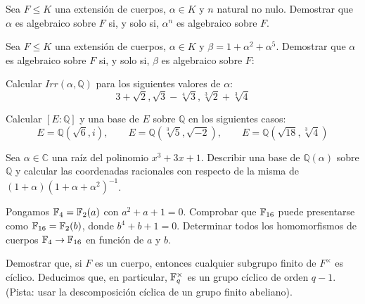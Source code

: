\begin{ejercicio}
    Sea $F\leq K$ una extensión de cuerpos, $\alpha\in K$ y $n$ natural no nulo. Demostrar que $\alpha$ es algebraico sobre $F$ si, y solo si, $\alpha^n$ es algebraico sobre $F$.
\end{ejercicio}

\begin{ejercicio}
    Sea $F\leq K$ una extensión de cuerpos, $\alpha\in K$ y $\beta = 1+\alpha^2 + \alpha^5$. Demostrar que $\alpha$ es algebraico sobre $F$ si, y solo si, $\beta$ es algebraico sobre $F$:
\end{ejercicio}

\begin{ejercicio}
    Calcular $Irr(\alpha,\mathbb{Q})$ para los siguientes valores de $\alpha$:
    \begin{equation*}
        3+\sqrt{2}, \sqrt{3}-\sqrt[4]{3}, \sqrt[3]{2}+\sqrt[3]{4}
    \end{equation*}
\end{ejercicio}

\begin{ejercicio}
    Calcular $[E:\mathbb{Q}]$ y una base de $E$ sobre $\mathbb{Q}$ en los siguientes casos:
    \begin{equation*}
        E = \mathbb{Q}\left(\sqrt{6},i\right), \qquad E= \mathbb{Q}\left(\sqrt[3]{5},\sqrt{-2}\right), \qquad E = \mathbb{Q}\left(\sqrt{18},\sqrt[3]{4}\right)
    \end{equation*}
\end{ejercicio}

\begin{ejercicio}
    Sea $\alpha\in \mathbb{C}$ una raíz del polinomio $x^3+3x+1$. Describir una base de $\mathbb{Q}(\alpha)$ sobre $\mathbb{Q}$ y calcular las coordenadas racionales con respecto de la misma de $(1+\alpha){(1+\alpha+\alpha^2)}^{-1}$.
\end{ejercicio}

\begin{ejercicio}
    Pongamos $\mathbb{F}_4 = \mathbb{F}_2(a)$ con $a^2+a+1=0$. Comprobar que $\mathbb{F}_{16}$ puede presentarse como $\mathbb{F}_{16}=\mathbb{F}_2(b)$, donde $b^4+b+1=0$. Determinar todos los homomorfismos de cuerpos $\mathbb{F}_4\to \mathbb{F}_{16}$ en función de $a$ y $b$.
\end{ejercicio}

\begin{ejercicio}\label{ej:subgrupo_finito}
    Demostrar que, si $F$ es un cuerpo, entonces cualquier subgrupo finito de $F^\times$ es cíclico. Deducimos que, en particular, $\mathbb{F}_q^\times$ es un grupo cíclico de orden $q-1$. (Pista: usar la descomposición cíclica de un grupo finito abeliano).
\end{ejercicio}

